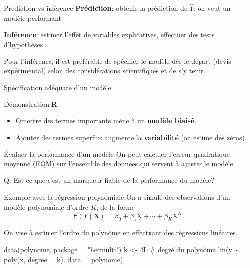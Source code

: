 \documentclass[
  ignorenonframetext,
]{beamer}
\newenvironment{Shaded}{\begin{snugshade}}{\end{snugshade}}
\newcommand{\AttributeTok}[1]{\textcolor[rgb]{0.40,0.45,0.13}{#1}}
\newcommand{\CommentTok}[1]{\textcolor[rgb]{0.37,0.37,0.37}{#1}}
\newcommand{\DecValTok}[1]{\textcolor[rgb]{0.68,0.00,0.00}{#1}}
\newcommand{\FunctionTok}[1]{\textcolor[rgb]{0.28,0.35,0.67}{#1}}
\newcommand{\NormalTok}[1]{\textcolor[rgb]{0.00,0.23,0.31}{#1}}
\newcommand{\OtherTok}[1]{\textcolor[rgb]{0.00,0.23,0.31}{#1}}
\newcommand{\SpecialCharTok}[1]{\textcolor[rgb]{0.37,0.37,0.37}{#1}}
\newcommand{\StringTok}[1]{\textcolor[rgb]{0.13,0.47,0.30}{#1}}
\providecommand{\tightlist}{%
  \setlength{\itemsep}{0pt}\setlength{\parskip}{0pt}}\usepackage{longtable,booktabs,array}
\begin{document}
\begin{frame}{Prédiction vs inférence}
\label{pruxe9diction-vs-infuxe9rence}
\textbf{Prédiction}: obtenir la prédiction de \(\widehat{Y}\): on veut
un modèle performant

\textbf{Inférence}: estimer l'effet de variables explicatives, effectuer
des tests d'hypothèses

Pour l'inférence, il est préférable de spécifier le modèle dès le départ
(devis expérimental) selon des considérations scientifiques et de s'y
tenir.
\end{frame}

\begin{frame}{Spécification adéquate d'un modèle}
\label{spuxe9cification-aduxe9quate-dun-moduxe8le}
\begin{block}{Démonstration \textbf{R}}
\label{duxe9monstration-r}
\begin{itemize}
\tightlist
\item
  Omettre des termes importants mène à un \textbf{modèle biaisé}.
\item
  Ajouter des termes superflus augmente la \textbf{variabilité} (on
  estime des zéros).
\end{itemize}
\end{block}
\end{frame}

\begin{frame}{Évaluer la performance d'un modèle}
\label{uxe9valuer-la-performance-dun-moduxe8le}
On peut calculer l'erreur quadratique moyenne (EQM) sur l'ensemble des
données qui servent à ajuster le modèle.

Q: Est-ce que c'est un marqueur fiable de la performance du modèle?
\end{frame}

\begin{frame}[fragile]{Exemple avec la régression polynomiale}
\label{exemple-avec-la-ruxe9gression-polynomiale}
On a simulé des observations d'un modèle polynomiale d'ordre \(K\), de
la forme
\[\mathsf{E}(Y \mid \mathbf{X}) = \beta_0 + \beta_1 \mathrm{X} + \cdots + \beta_K \mathrm{X}^K.\]

On vise à estimer l'ordre du polynôme en effectuant des régressions
linéaires.

\begin{Shaded}
\begin{Highlighting}[numbers=left,,]
\FunctionTok{data}\NormalTok{(polynome, }\AttributeTok{package =} \StringTok{"hecmulti"}\NormalTok{)}
\NormalTok{k }\OtherTok{\textless{}{-}} \DecValTok{4}\NormalTok{L }\CommentTok{\# degré du polynôme}
\FunctionTok{lm}\NormalTok{(y }\SpecialCharTok{\textasciitilde{}} \FunctionTok{poly}\NormalTok{(x, }\AttributeTok{degree =}\NormalTok{ k), }
   \AttributeTok{data =}\NormalTok{ polynome)}
\end{Highlighting}
\end{Shaded}
\end{frame}
\end{document}
